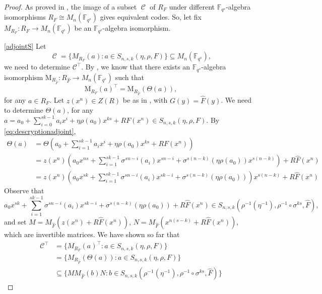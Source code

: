 \documentclass[a4paper, 11pt]{article}
\DeclareMathOperator{\C}{\mathcal{C}}
\newcommand{\F}{{\mathbb F}}
\newcommand{\M}{\mathrm{M}}
\begin{document}
\begin{proof}
As proved in , the image of a subset $\C$ of $R_F$ under different $\F_{q^s}$-algebra isomorphisms $R_F \cong M_n(\F_{q^s})$ gives equivalent codes.  So, let fix $M_{R_F}:R_F \rightarrow M_n(\F_{q^s})$ be an $\F_{q^s}$-algebra isomorphism. 

\eqref{adjointS} Let 
\[
\C=\{M_{R_F}(a) \colon a \in S_{n,s,k}(\eta,\rho,F)\} \subseteq M_n(\F_{q^s}),
\]
we need to determine $\mathcal{C}^{\top}$. By , we know that there exists an $\F_{q^s}$-algebra isomorphism $\M_{R_{\hat{F}}}:R_{\hat{F}}\rightarrow M_n(\F_{q^s})$ such that \[
\M_{R_F}(a)^{\top}=\M_{R_{\hat{F}}}(\Theta(a)),
\]
for any $a \in R_F$. Let $z(x^n) \in Z(R)$ be as in , with $G(y)=\hat{F}(y)$. We need to determine $\Theta(a)$, for any $a = a_0+\sum_{i=0}^{sk-1}a_ix^i+\eta \rho(a_0)x^{ks} +RF(x^n) \in S_{n,s,k}(\eta,\rho,F)$. By \eqref{eq:descryptionadjoint}, 
\[
\begin{split}
\Theta(a) & = \Theta\left( a_0+\sum\limits_{i=1}^{sk-1}a_ix^i+\eta \rho(a_0)x^{ks}  + RF(x^n)\right) \\ & = z(x^n)\left( a_0x^{ns}+\sum\limits_{i=1}^{sk-1}\sigma^{sn-i}(a_i)x^{sn-i}+\sigma^{s(n-k)}(\eta \rho(a_0))x^{s(n-k)} \right) +R\hat{F}(x^n) \\
& = z(x^n)\left( a_0x^{sk}+\sum\limits_{i=1}^{sk-1}\sigma^{sn-i}(a_i)x^{sk-i}+\sigma^{s(n-k)}(\eta \rho(a_0)) \right)x^{s(n-k)} +R\hat{F}(x^n)
\end{split}
\]
Observe that 
\[
a_0x^{sk}+\sum\limits_{i=1}^{sk-1}\sigma^{sn-i}(a_i)x^{sk-i}+\sigma^{s(n-k)}(\eta \rho(a_0))  + R\hat{F}(x^n) \in S_{n,s,k}(\rho^{-1}(\eta^{-1}),\rho^{-1}\circ \sigma^{ks},\hat{F}),
\] 
and set \(M = M_{\hat{F}}(z(x^n)+ R\hat{F}(x^n))\), 
\(N = M_{\hat{F}}(x^{n(s-k)}+R\hat{F}(x^n))\), which are invertible matrices.  
We have shown so far that
\[
\begin{split}
\C^{\top} &= \{M_{R_F}(a)^{\top} \colon a \in S_{n,s,k}(\eta,\rho,F)\} \\
&= \{M_{R_{\hat{F}}}(\Theta(a)) \colon a \in S_{n,s,k}(\eta,\rho,F)\} \\
&\subseteq \{M M_{\hat{F}}(b) N : b \in S_{n,s,k}(\rho^{-1}(\eta^{-1}),\rho^{-1}\circ \sigma^{ks},\hat{F})\}

\end{split}\]
\end{proof}
\end{document}
